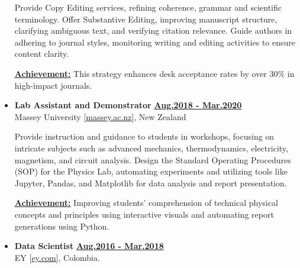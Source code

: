 \begin{itemize}[leftmargin=5mm]

          Provide Copy Editing services, refining coherence, grammar and scientific terminology.
          Offer Substantive Editing, improving manuscript structure, clarifying ambiguous text, and verifying citation relevance.
          Guide authors in adhering to journal styles, monitoring writing and editing activities to ensure content clarity.

          \textbf{\href{.}{\underline{Achievement:}}}
          This strategy enhances desk acceptance rates by over 30\% in high-impact journals.


    \item \textbf{\large Lab Assistant and Demonstrator}\hfill
          \href{.}{\bf Aug.2018 - Mar.2020}\\
          Massey University [\href{www.massey.ac.nz}{massey.ac.nz}],
          New Zealand


          Provide instruction and guidance to students in workshops, focusing on intricate subjects such as advanced mechanics, thermodynamics, electricity, magnetism, and circuit analysis.
          Design the Standard Operating Procedures (SOP) for the Physics Lab, automating experiments and utilizing tools like Jupyter, Pandas, and Matplotlib for data analysis and report presentation.

          \textbf{\href{.}{\underline{Achievement:}}}
          Improving students' comprehension of technical physical concepts and principles using interactive visuals and automating report generations using Python.

    \item \textbf{\large Data Scientist}\hfill
          \href{.}{\bf Aug.2016 - Mar.2018}\\
          EY [\href{www.ey.com}{ey.com}],
          Colombia.


\end{itemize}
